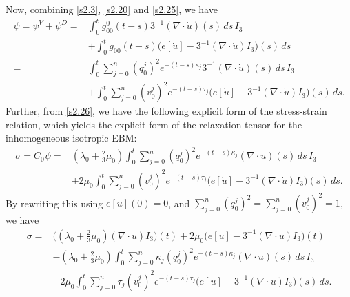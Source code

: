 \documentclass[a4paper,12pt]{article}
\newtheorem{a priori condition}[Th]{A priori condition}
\begin{document}
Now, combining \eqref{s2.3}, \eqref{s2.20} and \eqref{s2.25}, we have 
\begin{equation}\label{s2.26}
\begin{aligned}
\psi=\psi^V+\psi^D=&\int_0^t g^0_{00}(t-s)3^{-1}(\nabla\cdot\dot{u})(s)\,ds\,I_3\\
&+\int_0^t g_{00}(t-s)\big(e[\dot{u}]-3^{-1}(\nabla\cdot\dot{u})I_3\big) (s)\,ds\\
=&\int_0^t \sum_{j=0}^n(q_0^j)^2e^{-(t-s)\kappa_j}3^{-1}(\nabla\cdot\dot{u})(s)\,ds\,I_3\\
&+\int_0^t \sum_{j=0}^n(v_0^j)^2e^{-(t-s)\tau_j}\big(e[\dot{u}]-3^{-1}(\nabla\cdot\dot{u})I_3\big) (s)\,ds.
\end{aligned}
\end{equation}
Further, from \eqref{s2.26}, we have the following explicit form of the stress-strain relation, which yields the explicit form of the relaxation tensor for the inhomogeneous isotropic EBM:
\begin{equation}\label{s2.27}
\begin{aligned}
\sigma=C_0\psi
=&(\lambda_0+\frac{2}{3}\mu_0)\int_0^t \sum_{j=0}^n(q_0^j)^2e^{-(t-s)\kappa_j}(\nabla\cdot\dot{u})(s)\,ds\,I_3\\
&+2\mu_0\int_0^t \sum_{j=0}^n(v_0^j)^2e^{-(t-s)\tau_j}\big(e[\dot{u}]-3^{-1}(\nabla\cdot\dot{u})I_3\big) (s)\,ds.
\end{aligned}
\end{equation}
By rewriting this using $e[u](0)=0$, and $\sum_{j=0}^n (q_0^j)^2=\sum_{j=0}^n (v_0^j)^2=1$, we have 
\begin{equation}\label{s2.28}
\begin{aligned}
\sigma
=&\big((\lambda_0+\frac{2}{3}\mu_0)(\nabla\cdot u)I_3\big)(t)+ 2\mu_0\big(e[u]-3^{-1}(\nabla\cdot u)I_3\big) (t)\\
&-(\lambda_0+\frac{2}{3}\mu_0)\int_0^t \sum_{j=0}^n\kappa_j(q_0^j)^2e^{-(t-s)\kappa_j}(\nabla\cdot u)(s)\,ds\,I_3\\
&-2\mu_0\int_0^t \sum_{j=0}^n\tau_j(v_0^j)^2e^{-(t-s)\tau_j}\big(e[u]-3^{-1}(\nabla\cdot u)I_3\big) (s)\,ds.
\end{aligned}
\end{equation}
\end{document}
